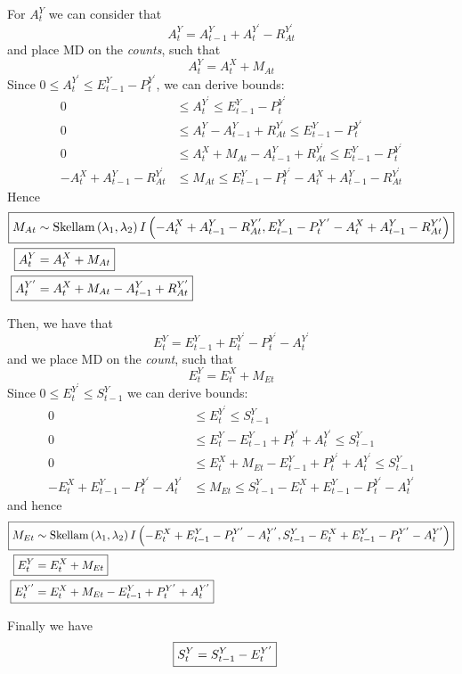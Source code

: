 \documentclass[a4paper]{article}
\begin{document}
For $A^Y_t$ we can consider that
\begin{equation*}
    A^Y_t = A^Y_{t - 1} + A^{Y^\prime}_t - R^{Y^\prime}_{At}
\end{equation*}
and place MD on the \textit{counts}, such that
\begin{equation*}
    A^Y_t = A^X_t + M_{At}
\end{equation*}
Since $0 \leq A^{Y^\prime}_t \leq E^Y_{t - 1} - P^{Y^\prime}_t$, we can derive bounds:
\begin{align*}
    0 &\leq A^{Y^\prime}_t \leq E^Y_{t - 1} - P^{Y^\prime}_t\\
    0 &\leq A^Y_t - A^Y_{t - 1} + R^{Y^\prime}_{At} \leq E^Y_{t - 1} - P^{Y^\prime}_t\\
    0 &\leq A^X_t + M_{At} - A^Y_{t - 1} + R^{Y^\prime}_{At} \leq E^Y_{t - 1} - P^{Y^\prime}_t\\
    -A^X_t + A^Y_{t - 1} - R^{Y^\prime}_{At} &\leq M_{At} \leq E^Y_{t - 1} - P^{Y^\prime}_t - A^X_t + A^Y_{t - 1} - R^{Y^\prime}_{At}
\end{align*}
Hence
\begin{align*}
\Aboxed{M_{At} &\sim \mbox{Skellam}\left(\lambda_1, \lambda_2\right)I\left(-A^X_t + A^Y_{t - 1} - R^{Y^\prime}_{At}, E^Y_{t - 1} - P^{Y^\prime}_t - A^X_t + A^Y_{t - 1} - R^{Y^\prime}_{At}\right)}\\
    \Aboxed{A^Y_t &= A^X_t + M_{At}}\\
    \Aboxed{A^{Y^\prime}_t &= A^X_t + M_{At} - A^Y_{t - 1} + R^{Y^\prime}_{At}}
\end{align*}

Then, we have that
\begin{equation*}
    E^Y_t = E^Y_{t - 1} + E^{Y^\prime}_t - P^{Y^\prime}_t - A^{Y^\prime}_t
\end{equation*}
and we place MD on the \textit{count}, such that
\begin{equation*}
    E^Y_t = E^X_t + M_{Et}
\end{equation*}
Since $0 \leq E^{Y^\prime}_t \leq S^Y_{t - 1}$ we can derive bounds:
\begin{align*}
    0 &\leq E^{Y^\prime}_t \leq S^Y_{t - 1}\\
    0 &\leq E^Y_t - E^Y_{t - 1} + P^{Y^\prime}_t + A^{Y^\prime}_t \leq S^Y_{t - 1}\\
    0 &\leq E^X_t + M_{Et} - E^Y_{t - 1} + P^{Y^\prime}_t + A^{Y^\prime}_t \leq S^Y_{t - 1}\\
    -E^X_t + E^Y_{t - 1} - P^{Y^\prime}_t - A^{Y^\prime}_t &\leq M_{Et} \leq S^Y_{t - 1} - E^X_t + E^Y_{t - 1} - P^{Y^\prime}_t - A^{Y^\prime}_t 
\end{align*}
and hence
\begin{align*}
\Aboxed{M_{Et} &\sim \mbox{Skellam}\left(\lambda_1, \lambda_2\right)I\left(-E^X_t + E^Y_{t - 1} - P^{Y^\prime}_t - A^{Y^\prime}_t, S^Y_{t - 1} - E^X_t + E^Y_{t - 1} - P^{Y^\prime}_t - A^{Y^\prime}_t\right)}\\
    \Aboxed{E^Y_t &= E^X_t + M_{Et}}\\
    \Aboxed{E^{Y^\prime}_t &= E^X_t + M_{Et} - E^Y_{t - 1} + P^{Y^\prime}_t + A^{Y^\prime}_t}
\end{align*}

Finally we have
\begin{align*}
    \Aboxed{S^Y_t &= S^Y_{t - 1} - E^{Y^\prime}_t}
\end{align*}


\end{document}
